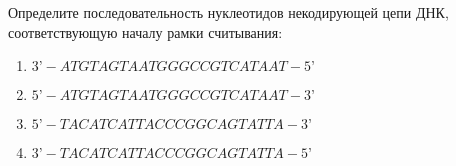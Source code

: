 
Определите последовательность нуклеотидов
некодирующей цепи ДНК, соответствующую началу рамки считывания:

\begin{enumerate}
    \item $3’-ATGTAGTAATGGGCCGTCATAAT-5’$
    \item $5’-ATGTAGTAATGGGCCGTCATAAT-3’$
    \item $5’-TACATCATTACCCGGCAGTATTA-3’$
    \item $3’-TACATCATTACCCGGCAGTATTA-5’$
\end{enumerate}


\explanationSection

